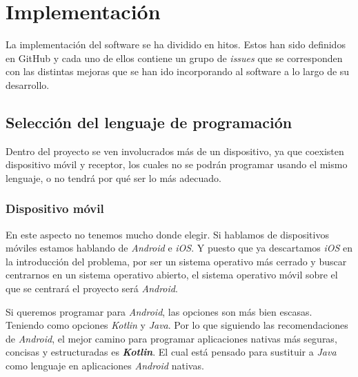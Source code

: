 \chapter{Implementación}

La implementación del software se ha dividido en hitos. Estos han sido definidos en GitHub
y cada uno de ellos contiene un grupo de \textit{issues} que se corresponden con las distintas
mejoras que se han ido incorporando al software a lo largo de su desarrollo.\\

\section{Selección del lenguaje de programación}

Dentro del proyecto se ven involucrados más de un dispositivo, ya que coexisten
dispositivo móvil y receptor, los cuales no se podrán programar usando el mismo
lenguaje, o no tendrá por qué ser lo más adecuado.

\subsection{Dispositivo móvil}

En este aspecto no tenemos mucho donde elegir. Si hablamos de dispositivos
móviles estamos hablando de \emph{Android} e \emph{iOS}. Y puesto que ya
descartamos \emph{iOS} en la introducción del problema, por ser un sistema
operativo más cerrado y buscar centrarnos en un sistema operativo abierto, el
sistema operativo móvil sobre el que se centrará el proyecto será \emph{Android}.

Si queremos programar para \emph{Android}, las opciones son más bien escasas.
Teniendo como opciones \emph{Kotlin} y \emph{Java}. Por lo que siguiendo las
recomendaciones de \emph{Android}, el mejor camino para programar aplicaciones
nativas más seguras, concisas y estructuradas es \textbf{\emph{Kotlin}}. El cual está
pensado para sustituir a \emph{Java} como lenguaje en aplicaciones
\emph{Android} nativas.